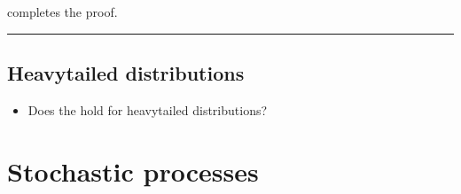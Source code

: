 \documentclass[letterpaper,10pt,english]{jupyterBook}
\begin{document}
\sphinxAtStartPar
{} completes the proof. 


\bigskip\hrule\bigskip


\sphinxstepscope


\section{Heavy\sphinxhyphen{}tailed distributions}
\label{\detokenize{ch/prob/heavy-tailed:heavy-tailed-distributions}}\label{\detokenize{ch/prob/heavy-tailed:prob-heavy-tailed}}\label{\detokenize{ch/prob/heavy-tailed::doc}}\begin{itemize}
\item {} 
\sphinxAtStartPar
Does the {\hyperref[\detokenize{ch/prob/iid:prob-iid-clt}]{}} hold for heavy\sphinxhyphen{}tailed distributions?

\end{itemize}

\sphinxstepscope


\chapter{Stochastic processes}
\label{\detokenize{ch/prob/processes:stochastic-processes}}\label{\detokenize{ch/prob/processes:prob-processes}}\label{\detokenize{ch/prob/processes::doc}}
\sphinxAtStartPar
{}
\end{document}
